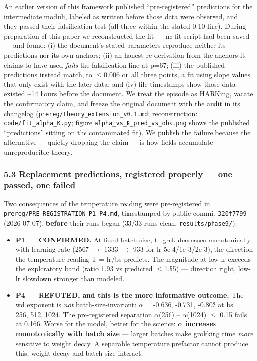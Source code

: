 \documentclass[
  11pt,
]{article}
\providecommand{\tightlist}{%
  \setlength{\itemsep}{0pt}\setlength{\parskip}{0pt}}
\begin{document}
An earlier version of this framework published ``pre-registered''
predictions for the intermediate moduli, labeled as written before those
data were observed, and they passed their falsification test (all three
within the stated 0.10 line). During preparation of this paper we
reconstructed the fit --- no fit script had been saved --- and found:
(i) the document's stated parameters reproduce neither its predictions
nor its own anchors; (ii) an honest re-derivation from the anchors it
claims to have used \emph{fails} the falsification line at p=67; (iii)
the published predictions instead match, to $\leq$0.006 on all three points,
a fit using slope values that only exist with the later data; and (iv)
file timestamps show those data existed \textasciitilde14 hours before
the document. We treat the episode as HARKing, vacate the confirmatory
claim, and freeze the original document with the audit in its changelog
(\texttt{prereg/theory\_extension\_v0.1.md}; reconstruction:
\texttt{code/fit\_alpha\_K.py}; figure
\texttt{alpha\_vs\_K\_pred\_vs\_obs.png} shows the published
``predictions'' sitting on the contaminated fit). We publish the failure
because the alternative --- quietly dropping the claim --- is how fields
accumulate unreproducible theory.

\subsubsection{5.3 Replacement predictions, registered properly --- one
passed, one
failed}\label{replacement-predictions-registered-properly-one-passed-one-failed}

Two consequences of the temperature reading were pre-registered in
\texttt{prereg/PRE\_REGISTRATION\_P1\_P4.md}, timestamped by public
commit \texttt{320f7799} (2026-07-07), \textbf{before} their runs began
(33/33 runs clean, \texttt{results/phase9/}):

\begin{itemize}
\tightlist
\item
  \textbf{P1 --- CONFIRMED.} At fixed batch size, t\_grok decreases
  monotonically with learning rate (2567 $\to$ 1333 $\to$ 933 for lr
  5e-4/1e-3/2e-3), the direction the temperature reading T = lr/bs
  predicts. The magnitude at low lr exceeds the exploratory band (ratio
  1.93 vs predicted $\leq$1.55) --- direction right, low-lr slowdown stronger
  than modeled.
\item
  \textbf{P4 --- REFUTED, and this is the more informative outcome.} The
  wd exponent is \emph{not} batch-size-invariant: $\alpha$ = -0.636, -0.731,
  -0.802 at bs = 256, 512, 1024. The pre-registered separation
  \textbar $\alpha$(256) -- $\alpha$(1024)\textbar{} $\leq$ 0.15 fails at 0.166. Worse for
  the model, better for the science: \textbf{\textbar $\alpha$\textbar{}
  increases monotonically with batch size} --- larger batches make
  grokking time \emph{more} sensitive to weight decay. A separable
  temperature prefactor cannot produce this; weight decay and batch size
  interact.
\end{itemize}
\end{document}
